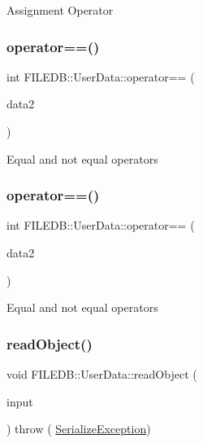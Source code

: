 Assignment Operator \mbox{\label{classFILEDB_1_1UserData_a1ba93b241613cfbecceabb9bf1040d2e}} 
\subsubsection{\texorpdfstring{operator==()}{operator==()}\hspace{0.1cm}{\footnotesize\ttfamily [1/2]}}
{\footnotesize\ttfamily int F\+I\+L\+E\+D\+B\+::\+User\+Data\+::operator== (\begin{DoxyParamCaption}\item[{const \mbox{\hyperlink{classFILEDB_1_1UserData}{User\+Data}} \&}]{data2 }\end{DoxyParamCaption})}

Equal and not equal operators \mbox{\label{classFILEDB_1_1UserData_a1ba93b241613cfbecceabb9bf1040d2e}} 
\subsubsection{\texorpdfstring{operator==()}{operator==()}\hspace{0.1cm}{\footnotesize\ttfamily [2/2]}}
{\footnotesize\ttfamily int F\+I\+L\+E\+D\+B\+::\+User\+Data\+::operator== (\begin{DoxyParamCaption}\item[{const \mbox{\hyperlink{classFILEDB_1_1UserData}{User\+Data}} \&}]{data2 }\end{DoxyParamCaption})}

Equal and not equal operators \mbox{\label{classFILEDB_1_1UserData_a61ccded861bac4b772af2488a2cc7605}} 
\subsubsection{\texorpdfstring{readObject()}{readObject()}\hspace{0.1cm}{\footnotesize\ttfamily [1/2]}}
{\footnotesize\ttfamily void F\+I\+L\+E\+D\+B\+::\+User\+Data\+::read\+Object (\begin{DoxyParamCaption}\item[{const std\+::string \&}]{input }\end{DoxyParamCaption}) throw ( \mbox{\hyperlink{classFILEDB_1_1SerializeException}{Serialize\+Exception}}) \hspace{0.3cm}{\ttfamily [virtual]}}

